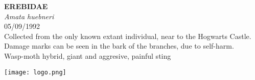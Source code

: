 \documentclass[
  landscape]{article}
\begin{document}
\begin{mdframed}[linecolor=mycolortext, linewidth=2pt, backgroundcolor=mycolor]

  \bigskip
  \begin{flushright}
  \begin{minipage}[t][-50ex][t]{16em}  
  \end{minipage}
  \end{flushright}
  \bigskip
  \begin{adjustwidth}{1cm}{1cm}
  {\fontsize{50pt}{0pt}\selectfont\bf\textcolor{mycolortext}{ EREBIDAE }} \\
  \linebreak
  \linebreak
  {\fontsize{40pt}{100pt}\selectfont\textcolor{mycolortext}{\emph{ Amata huebneri }}} \\
  \vfill
  {\fontsize{30pt}{100pt}\selectfont\textcolor{mycolortext}{ 05/09/1992 }} \\
  \vfill
  {\fontsize{30pt}{100pt}\selectfont\textcolor{mycolortext}{ Collected from the only known extant individual, near to the Hogwarts Castle. Damage marks can be seen in the bark of the branches, due to self-harm. }} \\
  \vfill
  {\fontsize{30pt}{50pt}\selectfont\textcolor{mycolortext}{ Wasp-moth hybrid, giant and aggresive, painful sting }} \\
  \end{adjustwidth}
  \begin{center}
  \texttt{[image: logo.png]}
  \end{center}
  \end{mdframed}
  \pagebreak

\end{document}

